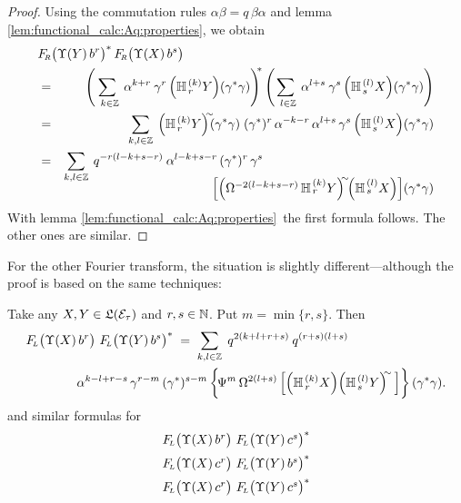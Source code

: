 \begin{proof}
Using the commutation rules $\alpha\beta = q\,\beta\alpha$ and
lemma \ref{lem:functional_calc:Aq:properties}, we obtain
\begin{eqnarray*}
\lefteqn{\FRabb\!\left(\Upsilon(Y)\, b^r \vertM\right)^*
         \FRabb\!\left(\Upsilon(X)\,b^s \vertM\right) }  \\
&=&
    \left(\sum_{\;\:k\in\ZZ} \: \alpha^{k+r} \: \gamma^r
          \left(\YaH{r}{k}Y\right)\!(\gamma^*\gamma)
    \right)^{\!\!*}
    \left(\sum_{\;\:l\in\ZZ} \: \alpha^{l+s} \: \gamma^s
          \left(\YaH{s}{l}X\right)\!(\gamma^*\gamma) \right)  \\
&=&
    \sum_{k,l\in\ZZ} \:
    \left(\YaH{r}{k}Y\right)^{\!\!\sim} \!\!\!(\gamma^*\gamma) \;
    (\gamma^*)^r \, \alpha^{-k-r} \, \alpha^{l+s} \, \gamma^s
          \left(\YaH{s}{l}X\right)\!(\gamma^*\gamma) \\
&=&
    \sum_{k,l\in\ZZ} \: q^{-r(l-k+s-r)} \: \alpha^{l-k+s-r} \,
    (\gamma^*)^r  \, \gamma^s
 \hspace{-4em}\raisebox{-5ex}{$
    \left[ \left(\Omega^{-2(l-k+s-r)}\, \YaH{r}{k}Y\right)^{\!\!\sim} \!\!
           \left(\YaH{s}{l}X\right)
    \right]   \!(\gamma^*\gamma)  $}
\end{eqnarray*}
With lemma \ref{lem:functional_calc:Aq:properties}\ the first formula follows.
The other ones are similar.
\end{proof}
\vspace{2ex}



For the other Fourier transform, the situation is slightly different---although
the proof is based on the same techniques:


\begin{lemma_sec} \label{lemma:pre_plancherel:left}
Take any\/ $X,Y\in\mathfrak{L}(\mathcal E_\tau)$ and\/ $r, s \in \mathbb{N}$. Put\/ $m=\min\{r,s\}$.
Then
\begin{eqnarray*}
\lefteqn{\FLabb\! \left(\Upsilon(X)\, b^r \vertM\right) \,
         \FLabb\! \left(\Upsilon(Y)\, b^s \vertM\right)^*
\;=\;
               \sum_{k,l\in\ZZ}  \; q^{2(k+l+r+s)} \: q^{(r+s)(l+s)}   }\\
& \hspace{3em} &
    \alpha^{k-l+r-s} \, \gamma^{r-m} \, (\gamma^*)^{s-m}  \left\{ \! \Psi^m \, \Omega^{2(l+s)}
    \left[ \left(\YaH{r}{k}X\right) \! \left(\YaH{s}{l}Y\right)^{\!\!\sim}\,
    \right] \vertXL \! \right\} (\gamma^*\gamma).
\end{eqnarray*}
and similar formulas for
$$ \begin{array}{l}
   \FLabb\! \left(\Upsilon(X)\, b^r \vertM\right) \,
   \FLabb\! \left(\Upsilon(Y)\, c^s \vertM\right)^*
\\ \vertXL
   \FLabb\! \left(\Upsilon(X)\, c^r \vertM\right) \,
   \FLabb\! \left(\Upsilon(Y)\, b^s \vertM\right)^*
\\ \vertXL
   \FLabb\! \left(\Upsilon(X)\, c^r \vertM\right) \,
   \FLabb\! \left(\Upsilon(Y)\, c^s \vertM\right)^*
\end{array} $$
\end{lemma_sec}
\vspace{2ex}



